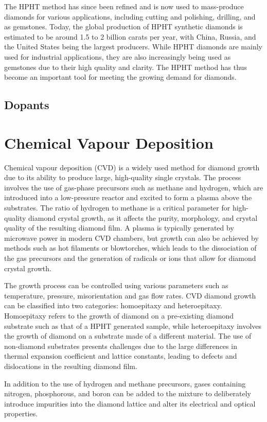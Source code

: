 The HPHT method has since been refined and is now used to mass-produce diamonds for various applications, including cutting and polishing, drilling, and as gemstones. Today, the global production of HPHT synthetic diamonds is estimated to be around 1.5 to 2 billion carats per year, with China, Russia, and the United States being the largest producers. While HPHT diamonds are mainly used for industrial applications, they are also increasingly being used as gemstones due to their high quality and clarity. The HPHT method has thus become an important tool for meeting the growing demand for diamonds.
\subsection{Dopants}

\section{Chemical Vapour Deposition}
Chemical vapour deposition (CVD) is a widely used method for diamond growth due to its ability to produce large, high-quality single crystals. The process involves the use of gas-phase precursors such as methane and hydrogen, which are introduced into a low-pressure reactor and excited to form a plasma above the substrates. The ratio of hydrogen to methane is a critical parameter for high-quality diamond crystal growth, as it affects the purity, morphology, and crystal quality of the resulting diamond film. A plasma is typically generated by microwave power in modern CVD chambers, but growth can also be achieved by methods such as hot filaments or blowtorches, which leads to the dissociation of the gas precursors and the generation of radicals or ions that allow for diamond crystal growth.

The growth process can be controlled using various parameters such as temperature, pressure, misorientation and gas flow rates. CVD diamond growth can be classified into two categories: homoepitaxy and heteroepitaxy. Homoepitaxy refers to the growth of diamond on a pre-existing diamond substrate such as that of a HPHT generated sample, while heteroepitaxy involves the growth of diamond on a substrate made of a different material. The use of non-diamond substrates presents challenges due to the large differences in thermal expansion coefficient and lattice constants, leading to defects and dislocations in the resulting diamond film.

In addition to the use of hydrogen and methane precursors, gases containing nitrogen, phosphorous, and boron can be added to the mixture to deliberately introduce impurities into the diamond lattice and alter its electrical and optical properties. 
